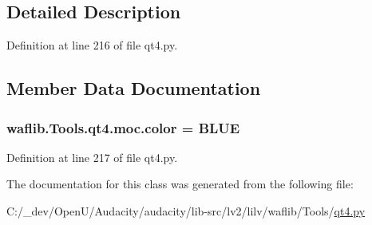\subsection{Detailed Description}


Definition at line 216 of file qt4.\+py.



\subsection{Member Data Documentation}
\subsubsection[{\texorpdfstring{color}{color}}]{ waflib.\+Tools.\+qt4.\+moc.\+color = \textquotesingle{}B\+L\+UE\textquotesingle{}\hspace{0.3cm}{\ttfamily [static]}}\hypertarget{classwaflib_1_1_tools_1_1qt4_1_1moc_acbefbdd5e0d8dd2208401f965ef35d1b}{}\label{classwaflib_1_1_tools_1_1qt4_1_1moc_acbefbdd5e0d8dd2208401f965ef35d1b}


Definition at line 217 of file qt4.\+py.



The documentation for this class was generated from the following file\+:\begin{DoxyCompactItemize}
\item 
C\+:/\+\_\+dev/\+Open\+U/\+Audacity/audacity/lib-\/src/lv2/lilv/waflib/\+Tools/\hyperlink{lilv_2waflib_2_tools_2qt4_8py}{qt4.\+py}\end{DoxyCompactItemize}
